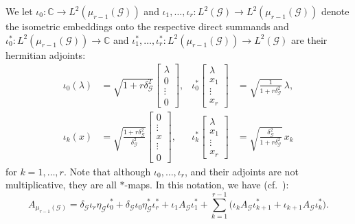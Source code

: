 \documentclass[11pt,reqno]{amsart}
\newcommand{\CC}{\mathbb{C}}
\begin{document}
We let $\iota_0\colon\CC\to L^2(\mu_{r-1}(\mathcal{G}))$ and $\iota_1,\dotsc,\iota_r\colon L^2(\mathcal{G})\to L^2(\mu_{r-1}(\mathcal{G}))$ denote the isometric embeddings onto the respective direct summands and $\iota_0^*\colon L^2(\mu_{r-1}(\mathcal{G}))\to\CC$ and $\iota_1^*,\dotsc,\iota_r^*\colon L^2(\mu_{r-1}(\mathcal{G}))\to L^2(\mathcal{G})$ are their hermitian adjoints:
\begin{align*}
\iota_0(\lambda)&=\sqrt{1+r\delta_{\scriptscriptstyle\mathcal{G}}^2}
\left[\begin{smallmatrix}
\lambda\\0\\[-5pt]\vdots\\0
\end{smallmatrix}\right],&
\iota_0^*
\left[\begin{smallmatrix}
\lambda\\x_1\\[-2pt]\vdots\\[2pt]x_r
\end{smallmatrix}\right]
&=\sqrt{\tfrac{1}{1+r\delta_{\scriptscriptstyle\mathcal{G}}^2}}\,\lambda,\\
\iota_k(x)
&=\sqrt{\tfrac{1+r\delta_{\scriptscriptstyle\mathcal{G}}^2}{\delta_{\scriptscriptstyle\mathcal{G}}^2}}
\left[\begin{smallmatrix}
0\\[-5pt]\vdots\\x\\[-5pt]\vdots\\0
\end{smallmatrix}\right],
&\iota_k^*
\left[\begin{smallmatrix}
\lambda\\x_1\\[-2pt]\vdots\\[2pt]x_r
\end{smallmatrix}\right]
&=\sqrt{\tfrac{\delta_{\scriptscriptstyle\mathcal{G}}^2}{1+r\delta_{\scriptscriptstyle\mathcal{G}}^2}}\,x_k
\end{align*}
for $k=1,\dotsc,r$. Note that although $\iota_0,\dotsc,\iota_r$, and their adjoints are not multiplicative, they are all $*$-maps. In this notation, we have (cf.~\cite[Eq.~(9)]{BochKaspMyc}):
\[
A_{\scriptscriptstyle\mu_{r-1}(\mathcal{G})}=\delta_{\scriptscriptstyle\mathcal{G}}\iota_r\eta_{\scriptscriptstyle\mathcal{G}}\iota_0^\ast +\delta_{\scriptscriptstyle\mathcal{G}}\iota_0\eta_{\scriptscriptstyle\mathcal{G}}^\ast\iota_r^\ast +\iota_1 A_{\scriptscriptstyle\mathcal{G}}\iota_1^\ast +\sum\limits_{k=1}^{r-1}\bigl(\iota_k A_{\scriptscriptstyle\mathcal{G}}\iota_{k+1}^\ast +\iota_{k+1} A_{\scriptscriptstyle\mathcal{G}}\iota_k^\ast\bigr).
\]
\end{document}
